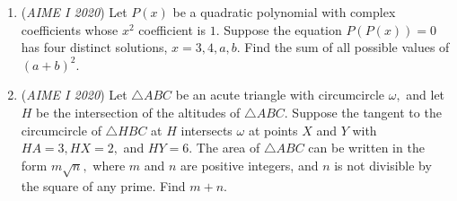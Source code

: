 \begin{enumerate}
 

	\item (\textit{AIME I 2020}) Let $P(x)$ be a quadratic polynomial with complex coefficients whose $x^2$ coefficient is $1.$ Suppose the equation $P(P(x))=0$ has four distinct solutions, $x=3,4,a,b.$ Find the sum of all possible values of $(a+b)^2.$


	\item (\textit{AIME I 2020}) Let $\triangle ABC$ be an acute triangle with circumcircle $\omega,$ and let $H$ be the intersection of the altitudes of $\triangle ABC.$ Suppose the tangent to the circumcircle of $\triangle HBC$ at $H$ intersects $\omega$ at points $X$ and $Y$ with $HA=3,HX=2,$ and $HY=6.$ The area of $\triangle ABC$ can be written in the form $m\sqrt{n},$ where $m$ and $n$ are positive integers, and $n$ is not divisible by the square of any prime. Find $m+n.$


\end{enumerate}